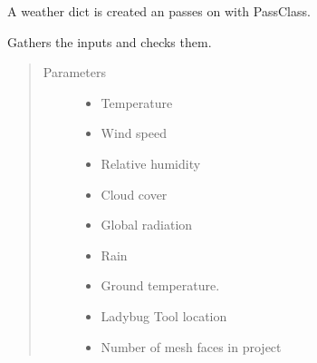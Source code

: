 \documentclass[letterpaper,10pt,english]{sphinxmanual}
\begin{document}
\begin{fulllineitems}
\begin{fulllineitems}
\begin{itemize}
\end{itemize}

A weather dict is created an passes on with PassClass.

\end{fulllineitems}


\begin{fulllineitems}
\label{\detokenize{cmf:livestock.components.comp_cmf.CMFWeather.run_checks}}
Gathers the inputs and checks them.
\begin{quote}\begin{description}
\item[{Parameters}] \leavevmode\begin{itemize}
\item {} 
 \textendash{} Temperature

\item {} 
 \textendash{} Wind speed

\item {} 
 \textendash{} Relative humidity

\item {} 
 \textendash{} Cloud cover

\item {} 
 \textendash{} Global radiation

\item {} 
 \textendash{} Rain

\item {} 
 \textendash{} Ground temperature.

\item {} 
 \textendash{} Ladybug Tool location

\item {} 
 \textendash{} Number of mesh faces in project

\end{itemize}

\end{description}\end{quote}

\end{fulllineitems}


\end{fulllineitems}
\end{document}
